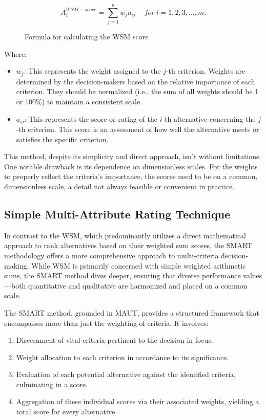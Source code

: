 \begin{figure}[h]
    \centering
    \Large
    \[ A_{i}^{WSM-score} = \sum_{j=1}^{n} w_{j} a_{ij} \quad \ for \ i = 1, 2, 3, \dots, m. \]
    \caption{Formula for calculating the \ac*{WSM} score\protect\footnotemark} 
\end{figure}

Where:
\begin{itemize}
    \item \(w_{j}\): This represents the weight assigned to the \(j\)-th criterion. Weights are determined by the decision-makers based on the relative importance of each criterion. They should be normalized (i.e., the sum of all weights should be 1 or 100\%) to maintain a consistent scale.
    
    \item \(a_{ij}\): This represents the score or rating of the \(i\)-th alternative concerning the \(j\)-th criterion. This score is an assessment of how well the alternative meets or satisfies the specific criterion. 
    \end{itemize}

This method, despite its simplicity and direct approach, isn't without limitations.
One notable drawback is its dependence on dimensionless scales.
For the weights to properly reflect the criteria's importance, the scores need to be on a common, dimensionless scale, a detail not always feasible or convenient in practice.

\subsection{Simple Multi-Attribute Rating Technique}

In contrast to the \ac{WSM}, which predominantly utilizes a
direct mathematical approach to rank alternatives based on their weighted sum
scores, the \ac{SMART} methodology offers a more comprehensive approach to
multi-criteria decision-making. While \ac{WSM} is primarily concerned with simple
weighted arithmetic sums, the \ac{SMART} method dives deeper, ensuring that diverse
performance values—both quantitative and qualitative are harmonized and placed
on a common scale.

The \ac{SMART} method, grounded in \ac{MAUT}, provides a
structured framework that encompasses more than just the weighting of criteria.
It involves:

\begin{enumerate} \item Discernment of vital criteria pertinent to the decision
in focus. \item Weight allocation to each criterion in accordance to its
significance. \item Evaluation of each potential alternative against the
identified criteria, culminating in a score. \item Aggregation of these
individual scores via their associated weights, yielding a total score for every
alternative. \end{enumerate}

